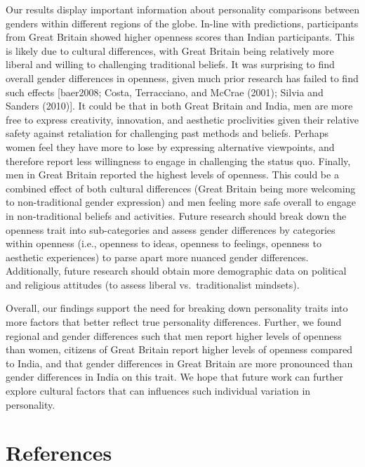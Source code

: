 \documentclass[
  english,
  man, fleqn, noextraspace]{apa6}
\begin{document}
Our results display important information about personality comparisons between genders within different regions of the globe. In-line with predictions, participants from Great Britain showed higher openness scores than Indian participants. This is likely due to cultural differences, with Great Britain being relatively more liberal and willing to challenging traditional beliefs. It was surprising to find overall gender differences in openness, given much prior research has failed to find such effects {[}baer2008; Costa, Terracciano, and McCrae (2001); Silvia and Sanders (2010){]}. It could be that in both Great Britain and India, men are more free to express creativity, innovation, and aesthetic proclivities given their relative safety against retaliation for challenging past methods and beliefs. Perhaps women feel they have more to lose by expressing alternative viewpoints, and therefore report less willingness to engage in challenging the status quo. Finally, men in Great Britain reported the highest levels of openness. This could be a combined effect of both cultural differences (Great Britain being more welcoming to non-traditional gender expression) and men feeling more safe overall to engage in non-traditional beliefs and activities. Future research should break down the openness trait into sub-categories and assess gender differences by categories within openness (i.e., openness to ideas, openness to feelings, openness to aesthetic experiences) to parse apart more nuanced gender differences. Additionally, future research should obtain more demographic data on political and religious attitudes (to assess liberal vs.~traditionalist mindsets).

Overall, our findings support the need for breaking down personality traits into more factors that better reflect true personality differences. Further, we found regional and gender differences such that men report higher levels of openness than women, citizens of Great Britain report higher levels of openness compared to India, and that gender differences in Great Britain are more pronounced than gender differences in India on this trait. We hope that future work can further explore cultural factors that can influences such individual variation in personality.

\newpage

\hypertarget{references}{%
\section{References}\label{references}}
\end{document}
